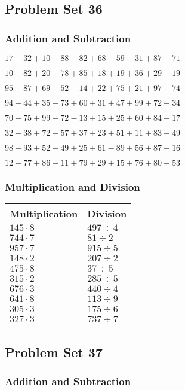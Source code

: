 \hypertarget{problem-set-36}{%
\subsection{Problem Set 36}\label{problem-set-36}}

\hypertarget{addition-and-subtraction-35}{%
\subsubsection{Addition and
Subtraction}\label{addition-and-subtraction-35}}

\(17+32+10+88-82+68-59-31+87-71\)

\(10+82+20+78+85+18+19+36+29+19\)

\(95+87+69+52-14+22+75+21+97+74\)

\(94+44+35+73+60+31+47+99+72+34\)

\(70+75+99+72-13+15+25+60+84+17\)

\(32+38+72+57+37+23+51+11+83+49\)

\(98+93+52+49+25+61-89+56+87-16\)

\(12+77+86+11+79+29+15+76+80+53\)

\hypertarget{multiplication-and-division-35}{%
\subsubsection{Multiplication and
Division}\label{multiplication-and-division-35}}

\begin{longtable}[]{@{}ll@{}}
\toprule
Multiplication & Division\tabularnewline
\midrule
\endhead
\(145\cdot8\) & \(497÷4\)\tabularnewline
\(744\cdot7\) & \(81÷2\)\tabularnewline
\(957\cdot7\) & \(915÷5\)\tabularnewline
\(148\cdot2\) & \(207÷2\)\tabularnewline
\(475\cdot8\) & \(37÷5\)\tabularnewline
\(315\cdot2\) & \(285÷5\)\tabularnewline
\(676\cdot3\) & \(440÷4\)\tabularnewline
\(641\cdot8\) & \(113÷9\)\tabularnewline
\(305\cdot3\) & \(175÷6\)\tabularnewline
\(327\cdot3\) & \(737÷7\)\tabularnewline
\bottomrule
\end{longtable}

\hypertarget{problem-set-37}{%
\subsection{Problem Set 37}\label{problem-set-37}}

\hypertarget{addition-and-subtraction-36}{%
\subsubsection{Addition and
Subtraction}\label{addition-and-subtraction-36}}

